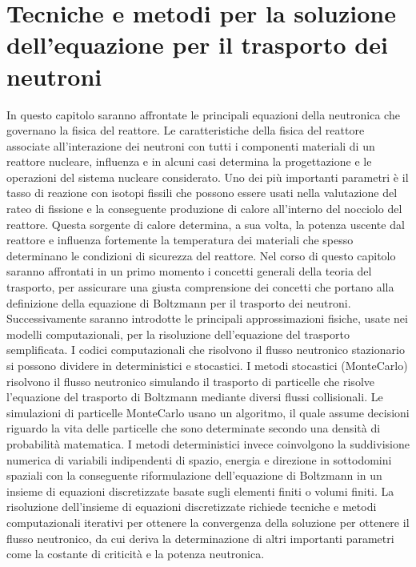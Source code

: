 \chapter[Equazione del trasporto]{Tecniche e metodi per la soluzione dell'equazione per il trasporto dei neutroni 
\label{cap2}}
In questo capitolo saranno affrontate le principali equazioni della neutronica 
che governano la fisica del reattore. Le caratteristiche della fisica del 
reattore associate all'interazione dei neutroni con tutti i componenti materiali 
di un reattore nucleare, influenza e in alcuni casi determina la progettazione e 
le operazioni del sistema nucleare considerato.
Uno dei più importanti parametri è il tasso di reazione con isotopi fissili che 
possono essere usati nella valutazione del rateo di fissione e la conseguente 
produzione di calore all'interno del nocciolo del reattore. Questa sorgente di 
calore determina, a sua volta, la potenza uscente dal reattore e influenza 
fortemente la temperatura dei materiali che spesso determinano le condizioni di 
sicurezza del reattore.
Nel corso di questo capitolo saranno affrontati in un primo momento i 
concetti generali della teoria del trasporto, per assicurare una giusta 
comprensione dei concetti che portano alla definizione della equazione di 
Boltzmann per il trasporto dei neutroni.
Successivamente saranno introdotte le principali approssimazioni fisiche, usate 
nei modelli computazionali, per la risoluzione dell'equazione del trasporto 
semplificata.  
I codici computazionali che risolvono il flusso neutronico stazionario si 
possono dividere in deterministici e stocastici. 
I metodi stocastici (MonteCarlo) risolvono il flusso neutronico simulando il 
trasporto di particelle che risolve l'equazione del 
trasporto di Boltzmann mediante diversi flussi collisionali. 
Le simulazioni di particelle MonteCarlo usano un 
algoritmo, il quale assume decisioni riguardo la vita delle particelle che sono 
determinate secondo una densità di probabilità matematica.
I metodi deterministici invece coinvolgono la suddivisione numerica di variabili 
indipendenti di spazio, energia e direzione in sottodomini spaziali
con la  conseguente riformulazione dell'equazione di Boltzmann in un insieme di 
equazioni discretizzate basate sugli elementi finiti o volumi finiti. 
La risoluzione dell'insieme di equazioni discretizzate richiede tecniche e 
metodi computazionali iterativi per ottenere la convergenza della soluzione 
per ottenere il flusso neutronico, da cui deriva la determinazione di altri 
importanti parametri come la costante di criticit\`a  e la potenza neutronica.

